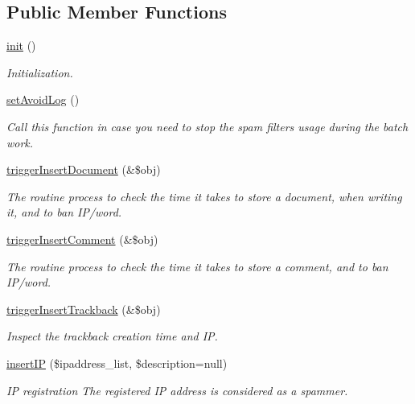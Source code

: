 \subsection*{Public Member Functions}
\begin{DoxyCompactItemize}
\item 
\hyperlink{classspamfilterController_a8204da601e789d60dbdfe0f692537e70}{init} ()
\begin{DoxyCompactList}\small\item\em Initialization. \end{DoxyCompactList}\item 
\hyperlink{classspamfilterController_a31282e59e182dca5e3f94e4c9122578d}{set\+Avoid\+Log} ()
\begin{DoxyCompactList}\small\item\em Call this function in case you need to stop the spam filter\textquotesingle{}s usage during the batch work. \end{DoxyCompactList}\item 
\hyperlink{classspamfilterController_a9ed78c37a603b06cb067ecdc523a2ae4}{trigger\+Insert\+Document} (\&\$obj)
\begin{DoxyCompactList}\small\item\em The routine process to check the time it takes to store a document, when writing it, and to ban I\+P/word. \end{DoxyCompactList}\item 
\hyperlink{classspamfilterController_ac01aa63960909cc5c95bfae15ded5d99}{trigger\+Insert\+Comment} (\&\$obj)
\begin{DoxyCompactList}\small\item\em The routine process to check the time it takes to store a comment, and to ban I\+P/word. \end{DoxyCompactList}\item 
\hyperlink{classspamfilterController_ace7cf6178aa16638526af5d73a9554eb}{trigger\+Insert\+Trackback} (\&\$obj)
\begin{DoxyCompactList}\small\item\em Inspect the trackback creation time and IP. \end{DoxyCompactList}\item 
\hyperlink{classspamfilterController_aab95351e0ebeffec58d24354aa92e3f5}{insert\+IP} (\$ipaddress\+\_\+list, \$description=null)
\begin{DoxyCompactList}\small\item\em IP registration The registered IP address is considered as a spammer. \end{DoxyCompactList}\item 

\end{DoxyCompactItemize}
